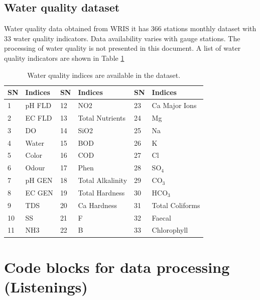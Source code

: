 \documentclass[a4paper, 12pt]{article}
\begin{document}
\subsection{Water quality dataset}\label{sec:wq} %
Water quality data obtained from WRIS it has 366 stations monthly dataset with 33 water quality indicators. Data availability varies with gauge stations. The processing of water quality is not presented in this document. A list of water quality indicators are shown in Table \ref{tbl:wq}

\begin{table}[!h]
\begin{tabular}{llllll}
\hline
SN & Indices & SN & Indices          & SN & Indices         \\ \hline
1  & pH FLD  & 12 & NO2              & 23 & Ca Major Ions   \\
2  & EC FLD  & 13 & Total Nutrients  & 24 & Mg              \\
3  & DO      & 14 & SiO2             & 25 & Na              \\
4  & Water   & 15 & BOD              & 26 & K               \\
5  & Color   & 16 & COD              & 27 & Cl              \\
6  & Odour   & 17 & Phen             & 28 & SO$_4$          \\
7  & pH GEN  & 18 & Total Alkalinity & 29 & CO$_3$          \\
8  & EC GEN  & 19 & Total Hardness   & 30 & HCO$_3$         \\
9  & TDS     & 20 & Ca Hardness      & 31 & Total Coliforms \\
10 & SS      & 21 & F                & 32 & Faecal          \\
11 & NH3     & 22 & B                & 33 & Chlorophyll     \\ \hline
\end{tabular}
\caption{Water quality indices are available in the dataset.}
\label{tbl:wq}
\end{table}

\clearpage
\section{Code blocks for data processing (Listenings)} \label{sec:CodeBlocks}
 
\end{document}
